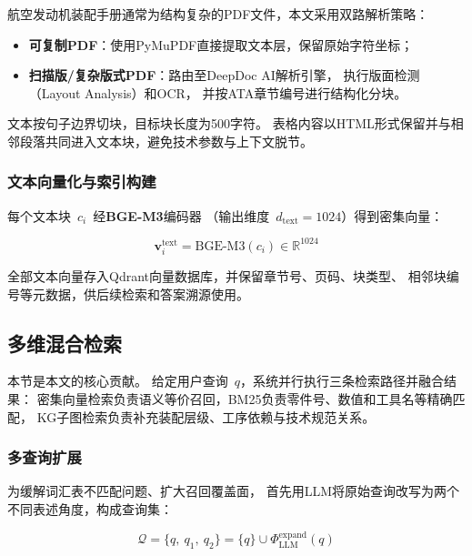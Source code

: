 航空发动机装配手册通常为结构复杂的PDF文件，本文采用双路解析策略：
\begin{itemize}
  \item \textbf{可复制PDF}：使用PyMuPDF直接提取文本层，保留原始字符坐标；
  \item \textbf{扫描版/复杂版式PDF}：路由至DeepDoc AI解析引擎，
        执行版面检测（Layout Analysis）和OCR，
        并按ATA章节编号进行结构化分块。
\end{itemize}

文本按句子边界切块，目标块长度为500字符。
表格内容以HTML形式保留并与相邻段落共同进入文本块，避免技术参数与上下文脱节。

\subsubsection{文本向量化与索引构建}
\label{sec:vectorize}

每个文本块~$c_i$~经\textbf{BGE-M3}编码器
（输出维度~$d_{\text{text}} = 1024$）得到密集向量：

\begin{equation}
  \mathbf{v}_i^{\text{text}} = \text{BGE-M3}(c_i) \in \mathbb{R}^{1024}
  \label{eq:text-vec}
\end{equation}

全部文本向量存入Qdrant向量数据库，并保留章节号、页码、块类型、
相邻块编号等元数据，供后续检索和答案溯源使用。

\subsection{多维混合检索}
\label{sec:retrieval}

本节是本文的核心贡献。
给定用户查询~$q$，系统并行执行三条检索路径并融合结果：
密集向量检索负责语义等价召回，BM25负责零件号、数值和工具名等精确匹配，
KG子图检索负责补充装配层级、工序依赖与技术规范关系。

\subsubsection{多查询扩展}
\label{sec:multi-query}

为缓解词汇表不匹配问题、扩大召回覆盖面，
首先用LLM将原始查询改写为两个不同表述角度，构成查询集：

\begin{equation}
  \mathcal{Q} = \{q,\ q_1,\ q_2\}
              = \{q\} \cup \Phi_{\text{LLM}}^{\text{expand}}(q)
  \label{eq:multi-query}
\end{equation}

